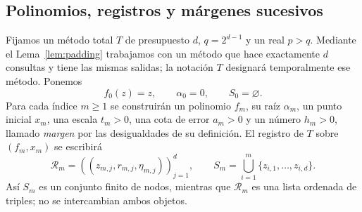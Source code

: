 \documentclass[11pt,a4paper]{article}
\numberwithin{equation}{section}
\theoremstyle{definition}
\theoremstyle{remark}
\newcommand{\Rec}{\mathcal R}
\begin{document}
\subsection{Polinomios, registros y márgenes sucesivos}
Fijamos un método total $T$ de presupuesto $d$, $q=2^{d-1}$ y un real $p>q$. Mediante el Lema~\ref{lem:padding} trabajamos con un método que hace exactamente $d$ consultas y tiene las mismas salidas; la notación $T$ designará temporalmente ese método. Ponemos
\[
f_0(z)=z,\qquad\alpha_0=0,\qquad S_0=\varnothing.
\]
Para cada índice $m\ge1$ se construirán un polinomio $f_m$, su raíz $\alpha_m$, un punto inicial $x_m$, una escala $t_m>0$, una cota de error $a_m>0$ y un número $h_m>0$, llamado \emph{margen} por las desigualdades de su definición. El registro de $T$ sobre $(f_m,x_m)$ se escribirá
\[
\Rec_m=((z_{m,j},r_{m,j},\eta_{m,j}))_{j=1}^{d},
\qquad
S_m=\bigcup_{i=1}^{m}\{z_{i,1},\ldots,z_{i,d}\}.
\]
Así $S_m$ es un conjunto finito de nodos, mientras que $\Rec_m$ es una lista ordenada de triples; no se intercambian ambos objetos.
\end{document}
